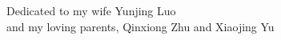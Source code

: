 
\begin{dedication}
Dedicated to my wife Yunjing Luo\\
and my loving parents, Qinxiong Zhu and Xiaojing Yu
\end{dedication}

